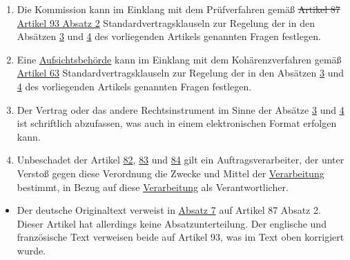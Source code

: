 \begin{enumerate}
  \item Die Kommission kann im Einklang mit dem Prüfverfahren gemäß \sout{Artikel 87} \hyperref[itm:93-2]{Artikel 93
   Absatz 2} Standardvertragsklauseln zur Regelung der in den Absätzen \hyperref[itm:28-3-1]{3} und \hyperref[itm:28-4]
   {4} des vorliegenden Artikels genannten Fragen festlegen.
  \label{itm:28-7}

  \item Eine \hyperref[itm:04-21]{Aufsichtsbehörde} kann im Einklang mit dem Kohärenzverfahren gemäß \hyperref[ch:63]{Artikel 63}
   Standardvertragsklauseln zur Regelung der in den Absätzen \hyperref[itm:28-3-1]{3} und \hyperref[itm:28-4]{4} des
   vorliegenden Artikels genannten Fragen festlegen.
  \label{itm:28-8}

  \item Der Vertrag oder das andere Rechtsinstrument im Sinne der Absätze \hyperref[itm:28-3-1]{3} und \hyperref
  [itm:28-4]
   {4} ist schriftlich abzufassen, was auch in einem elektronischen Format erfolgen kann.
  \label{itm:28-9}

  \item Unbeschadet der Artikel \hyperref[ch:82]{82}, \hyperref[ch:83]{83} und \hyperref[ch:84]{84} gilt ein
   Auftragsverarbeiter, der unter Verstoß gegen diese Verordnung die Zwecke und Mittel der \hyperref[itm:04-2]{Verarbeitung} bestimmt, in
   Bezug auf diese \hyperref[itm:04-2]{Verarbeitung} als Verantwortlicher.
  \label{itm:28-10}

\end{enumerate}


\begin{itemize}

  \item Der deutsche Originaltext verweist in \hyperref[itm:28-7]{Absatz 7} auf Artikel 87 Absatz 2. Dieser Artikel hat
  allerdings keine Absatzunterteilung. Der englische und französische Text verweisen beide auf Artikel 93, was im Text
  oben korrigiert wurde.

\end{itemize}

